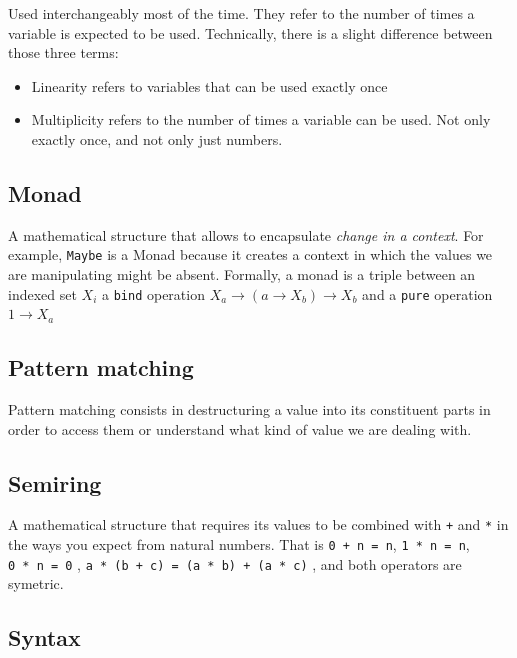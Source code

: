 \documentclass[
]{article}
\providecommand{\tightlist}{%
  \setlength{\itemsep}{0pt}\setlength{\parskip}{0pt}}
\begin{document}
Used interchangeably most of the time. They refer to the number of times
a variable is expected to be used. Technically, there is a slight
difference between those three terms:

\begin{itemize}
\tightlist
\item
  Linearity refers to variables that can be used exactly once
\item
  Multiplicity refers to the number of times a variable can be used. Not
  only exactly once, and not only just numbers.
\end{itemize}

\hypertarget{monad}{%
\subsection{Monad}\label{monad}}

A mathematical structure that allows to encapsulate \emph{change in a
context}. For example, \texttt{Maybe} is a Monad because it creates a
context in which the values we are manipulating might be absent.
Formally, a monad is a triple between an indexed set \(X_i\) a
\texttt{bind} operation \(X_a \to (a \to X_b) \to X_b\) and a
\texttt{pure} operation \(1 \to X_a\)

\hypertarget{pattern-matching-1}{%
\subsection{Pattern matching}\label{pattern-matching-1}}

Pattern matching consists in destructuring a value into its constituent
parts in order to access them or understand what kind of value we are
dealing with.

\hypertarget{semiring}{%
\subsection{Semiring}\label{semiring}}

A mathematical structure that requires its values to be combined with
\texttt{+} and \texttt{*} in the ways you expect from natural numbers.
That is \texttt{0\ +\ n\ =\ n}, \texttt{1\ *\ n\ =\ n},
\texttt{0\ *\ n\ =\ 0} ,
\texttt{a\ *\ (b\ +\ c)\ =\ (a\ *\ b)\ +\ (a\ *\ c)} , and both
operators are symetric.

\hypertarget{syntax-1}{%
\subsection{Syntax}\label{syntax-1}}
\end{document}
